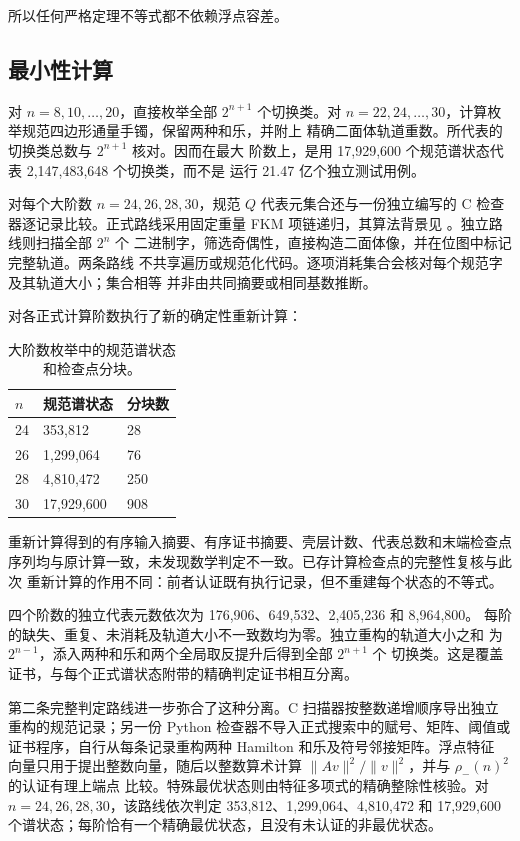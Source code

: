 所以任何严格定理不等式都不依赖浮点容差。

\subsection{最小性计算}

对 \(n=8,10,\ldots,20\)，直接枚举全部 \(2^{n+1}\) 个切换类。对
\(n=22,24,\ldots,30\)，计算枚举规范四边形通量手镯，保留两种和乐，并附上
精确二面体轨道重数。所代表的切换类总数与 \(2^{n+1}\) 核对。因而在最大
阶数上，是用 17,929,600 个规范谱状态代表 2,147,483,648 个切换类，而不是
运行 21.47 亿个独立测试用例。

对每个大阶数 \(n=24,26,28,30\)，规范 \(Q\) 代表元集合还与一份独立编写的
C 检查器逐记录比较。正式路线采用固定重量 FKM 项链递归，其算法背景见
\cite{FredricksenMaiorana1978,Sawada2001}。独立路线则扫描全部 \(2^n\) 个
二进制字，筛选奇偶性，直接构造二面体像，并在位图中标记完整轨道。两条路线
不共享遍历或规范化代码。逐项消耗集合会核对每个规范字及其轨道大小；集合相等
并非由共同摘要或相同基数推断。

对各正式计算阶数执行了新的确定性重新计算：

\begin{table}[tbp]
\centering
\caption{大阶数枚举中的规范谱状态和检查点分块。}
\label{tab:checkpoint-counts}
\begingroup
\renewcommand{\arraystretch}{1.12}
\begin{tabular}{lll}
\toprule
\(n\) & 规范谱状态 & 分块数 \\
\midrule
24 & 353,812 & 28 \\
26 & 1,299,064 & 76 \\
28 & 4,810,472 & 250 \\
30 & 17,929,600 & 908 \\
\bottomrule
\end{tabular}
\endgroup
\end{table}

重新计算得到的有序输入摘要、有序证书摘要、壳层计数、代表总数和末端检查点
序列均与原计算一致，未发现数学判定不一致。已存计算检查点的完整性复核与此次
重新计算的作用不同：前者认证既有执行记录，但不重建每个状态的不等式。

四个阶数的独立代表元数依次为 176,906、649,532、2,405,236 和 8,964,800。
每阶的缺失、重复、未消耗及轨道大小不一致数均为零。独立重构的轨道大小之和
为 \(2^{n-1}\)，添入两种和乐和两个全局取反提升后得到全部 \(2^{n+1}\) 个
切换类。这是覆盖证书，与每个正式谱状态附带的精确判定证书相互分离。

第二条完整判定路线进一步弥合了这种分离。C 扫描器按整数递增顺序导出独立
重构的规范记录；另一份 Python 检查器不导入正式搜索中的赋号、矩阵、阈值或
证书程序，自行从每条记录重构两种 Hamilton 和乐及符号邻接矩阵。浮点特征
向量只用于提出整数向量，随后以整数算术计算
\(\lVert Av\rVert^2/\lVert v\rVert^2\)，并与 \(\rho_-(n)^2\) 的认证有理上端点
比较。特殊最优状态则由特征多项式的精确整除性核验。对
\(n=24,26,28,30\)，该路线依次判定 353,812、1,299,064、4,810,472 和
17,929,600 个谱状态；每阶恰有一个精确最优状态，且没有未认证的非最优状态。

